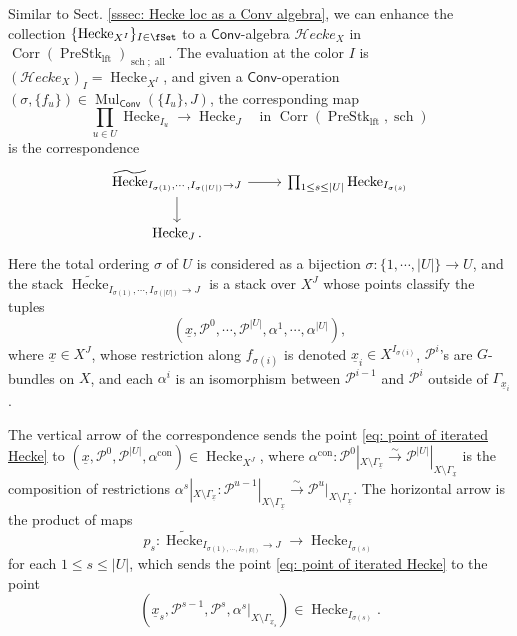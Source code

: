\documentclass[10pt]{amsart}
\newcommand{\sssec}{\subsubsection}
\theoremstyle{remark}
\newcommand{\te}{\text}
\newcommand{\ul}{\underline}
\newcommand{\wt}{\widetilde}
\newcommand{\cP}{\mathcal{P}}
\newcommand{\on}{\operatorname}
\newcommand{\PreStklft}{\on{PreStk}_{\on{lft}}}
\newcommand{\Hecke}{\on{Hecke}}
\newcommand{\Mul}{\on{Mul}}
\newcommand{\Conv}{\mathsf{Conv}}
\newcommand{\cHecke}{\mathcal{H}ecke}
\newcommand{\Corr}{\on{Corr}}
\begin{document}
\sssec{}\label{sssec: Hecke as a Conv algebra}
Similar to Sect. \ref{sssec: Hecke loc as a Conv algebra}, we can enhance the collection $\{\Hecke_{X^I}\}_{I\in\fSet}$ to a $\Conv$-algebra $\cHecke_X$ in $\Corr(\PreStklft)_{\on{sch};\on{all}}$. The evaluation at the color $I$ is $(\cHecke_X)_I = \Hecke_{X^I}$, and given a $\Conv$-operation $(\sigma,\{f_u\})\in \Mul_{\Conv}(\{I_u\}, J)$, the corresponding map
 \[\prod_{u\in U}\Hecke_{{I_u}}\rightarrow \Hecke_{J} \quad \te{in } \Corr(\PreStklft, \on{sch})\]
    is the correspondence
    \begin{equation}\label{eq: operation for cHecke stack}
        \begin{tikzcd}
	{\wt{\Hecke}_{I_{\sigma(1)},\cdots,I_{\sigma(|U|)}\rightarrow J}} & {\prod_{1\le s\le |U|}\Hecke_{I_{\sigma(s)}}} \\
	{\Hecke_J.}
	\arrow[from=1-1, to=1-2]
	\arrow[from=1-1, to=2-1]
\end{tikzcd}
    \end{equation}
Here the total ordering $\sigma$ of $U$ is considered as a bijection $\sigma:\{1,\cdots,|U|\}\rightarrow U$, and the stack $\wt{\Hecke}_{I_{\sigma(1)},\cdots,I_{\sigma(|U|)}\rightarrow J}$ is a stack over $X^J$ whose points classify the tuples 
\begin{equation}\label{eq: point of iterated Hecke}
(\ul{x},\cP^0,\cdots,\cP^{|U|},\alpha^1,\cdots,\alpha^{|U|}),
\end{equation}
where $\ul{x}\in X^J$, whose restriction along $f_{\sigma(i)}$ is denoted $\ul{x}_{i}\in X^{I_{\sigma(i)}}$, $\cP^i$'s are $G$-bundles on $X$, and each $\alpha^i$ is an isomorphism between $\cP^{i-1}$ and $\cP^{i}$ outside of $\Gamma_{\ul{x}_i}$. 
\medskip

The vertical arrow of the correspondence sends the point \eqref{eq: point of iterated Hecke} to $(\ul{x}, \cP^0,\cP^{|U|},\alpha^{\on{con}})\in \Hecke_{X^J}$, where $\alpha^{\on{con}}:\cP^0|_{X\setminus \Gamma_{\ul{x}}}\xrightarrow{\sim} \cP^{|U|}|_{X\setminus \Gamma_{\ul{x}}}$ is the composition of restrictions $\alpha^s|_{X\setminus \Gamma_{\ul{x}}}: \cP^{u-1}|_{X\setminus \Gamma_{\ul{x}}}\xrightarrow{\sim} \cP^{u}|_{X\setminus \Gamma_{\ul{x}}}$. The horizontal arrow is the product of maps 
\begin{equation*}
    p_s:\wt{\Hecke}_{I_{\sigma(1),\cdots,I_{\sigma(|U|)}}\rightarrow J}\rightarrow \Hecke_{I_{\sigma(s)}}
\end{equation*}
for each $1\le s\le |U|$, which sends the point \eqref{eq: point of iterated Hecke} to the point
\[(\ul{x}_s,\cP^{s-1}, \cP^{s},\alpha^s|_{X\setminus\Gamma_{\ul{x}_s}})\in \Hecke_{I_{\sigma(s)}}.\]
\end{document}
